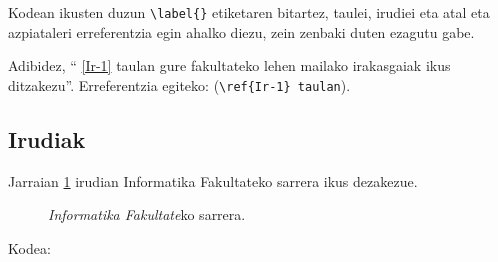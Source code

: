 \vspace{0.5 cm}

Kodean ikusten duzun \verb+\label{}+ etiketaren bitartez, taulei, irudiei eta atal eta azpiataleri erreferentzia egin ahalko diezu, zein zenbaki duten ezagutu gabe.

Adibidez, `` \ref{Ir-1} taulan gure fakultateko lehen mailako irakasgaiak ikus ditzakezu''. Erreferentzia egiteko: (\verb+\ref{Ir-1} taulan+).

\vspace{0.5 cm}

\subsection{Irudiak}
\label{azpiatala:irudiak}

Jarraian \ref{fig:infor-sarrera} irudian Informatika Fakultateko sarrera ikus dezakezue.


\begin{figure}[htbp] 
  \begin{center} 
    \caption{\emph{Informatika Fakultate}ko sarrera.} 
    \label{fig:infor-sarrera} 
  \end{center} 
\end{figure}

Kodea:
\vspace{0.5 cm}

